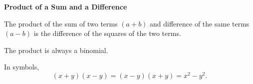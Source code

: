\begin{center}
\textbf{Product of a Sum and a Difference}
\end{center}

\vspce

The product  of the sum of two terms $(a + b)$ and  difference  of the same terms $(a - b)$ is the  difference  of the squares of the two terms.  

\vspce 

The product is always a binomial. 

\vspce 

In  symbols,  
$$(x + y)(x - y) = (x - y)(x + y)  =  x^{2} - y^{2}. $$  
